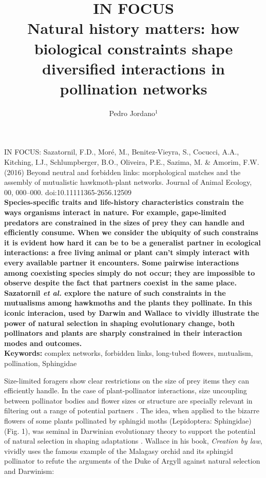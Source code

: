 \documentclass[a4paper,12pt]{article}
\title{IN FOCUS \\ Natural history matters: how biological constraints shape diversified interactions in pollination networks}
\author{Pedro Jordano$^{1}$}
\begin{document}
\maketitle

  \noindent 
  IN FOCUS: Sazatornil, F.D., Moré, M., Benitez-Vieyra, S., Cocucci, A.A., Kitching, I.J., Schlumpberger, B.O., Oliveira, P.E., Sazima, M. \& Amorim, F.W. (2016) Beyond neutral and forbidden links: morphological matches and the assembly of mutualistic hawkmoth-plant networks. Journal of Animal Ecology, 00, 000–000. doi:10.1111\/1365-2656.12509 \\
  
  \textbf{Species-specific traits and life-history characteristics constrain the ways organisms interact in nature. For example, gape-limited predators are constrained in the sizes of prey they can handle and efficiently consume. When we consider the ubiquity of such constrains it is evident how hard it can be to be a generalist partner in ecological interactions: a free living animal or plant can't simply interact with every available partner it encounters. Some pairwise interactions among coexisting species simply do not occur; they are impossible to observe despite the fact that partners coexist in the same place. Sazatornil \textit{et al.} \citep{Sazatornil:2016} explore the nature of such constraints in the mutualisms among hawkmoths and the plants they pollinate. In this iconic interacion, used by Darwin and Wallace to vividly illustrate the power of natural selection in shaping evolutionary change, both pollinators and plants are sharply constrained in their interaction modes and outcomes. } \\

\noindent \textbf{Keywords:} complex networks, forbidden links, long-tubed flowers, mutualism, pollination, Sphingidae

\newpage

Size-limited foragers show clear restrictions on the size of prey items they can efficiently handle. In the case of plant-pollinator interactions, size uncoupling between pollinator bodies and flower sizes or structure are specially relevant in filtering out a range of potential partners \citep{Cocucci:2009}. The idea, when applied to the bizarre flowers of some plants pollinated by sphingid moths (Lepidoptera: Sphingidae) (Fig. 1), was seminal in Darwinian evolutionary theory to support the potential of natural selection in shaping adaptations \citep{Arditti:2012}. Wallace \citep{Wallace:1867} in his book, \textit{Creation by law}, vividly uses the famous example of the Malagasy orchid and its sphingid pollinator to refute the arguments of the Duke of Argyll against natural selection and Darwinism:
\end{document}
